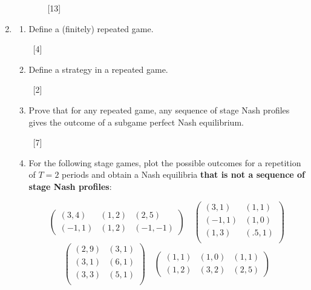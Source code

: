 \documentclass[12pt,a4paper]{article}
\begin{document}
\begin{enumerate}
\begin{enumerate}
\begin{enumerate}
            ~\hfill{[13]}

        \end{enumerate}
    \end{enumerate}

\newpage
\item

    \begin{enumerate}
        \item Define a (finitely) repeated game.

        ~\hfill[4]

        \item Define a strategy in a repeated game.


        ~\hfill[2]

        \item Prove that for any repeated game, any sequence of stage Nash profiles
            gives the outcome of a subgame perfect Nash equilibrium.

        ~\hfill[7]

        \item For the following stage games, plot the possible outcomes for a
            repetition of \(T=2\) periods and obtain a Nash equilibria
            \textbf{that is not a sequence of stage Nash profiles}:

            \[
                \begin{pmatrix}
                    (3,4) & (1,2) & (2,5)\\
                    (-1,1) & (1,2) & (-1,-1)
                \end{pmatrix}
                \quad
                \begin{pmatrix}
                    (3,1) & (1,1)\\
                    (-1,1) & (1,0)\\
                    (1,3) & (.5,1)\\
                \end{pmatrix}
            \]
            \[
                \begin{pmatrix}
                    (2,9) & (3,1)\\
                    (3,1) & (6,1)\\
                    (3,3) & (5,1)\\
                \end{pmatrix}
                \quad
                \begin{pmatrix}
                    (1,1) & (1,0) & (1,1)\\
                    (1,2) & (3,2) & (2,5)
                \end{pmatrix}
            \]


\end{enumerate}
\end{enumerate}
\end{document}
